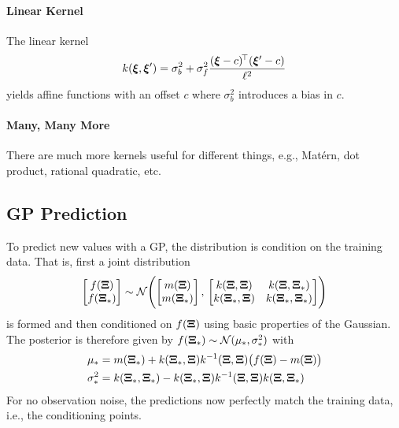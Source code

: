 			\paragraph{Linear Kernel}
				The linear kernel
				\begin{equation}
					k(\bm{\xi}, \bm{\xi}') = \sigma_b^2 + \sigma_f^2 \frac{(\bm{\xi} - c)^{\!\top} (\bm{\xi}' - c)}{\ell^2}
				\end{equation}
				yields affine functions with an offset \(c\) where \( \sigma_b^2 \) introduces a bias in \(c\).

			\paragraph{Many, Many More}
				There are much more kernels useful for different things, e.g., Matérn, dot product, rational quadratic, etc.

		\subsection{GP Prediction}
			To predict new values with a GP, the distribution is condition on the training data. That is, first a joint distribution
			\begin{equation}
				\begin{bmatrix}
					f(\bm{\mathrm{\Xi}}) \\
					f(\bm{\mathrm{\Xi}}_\ast)
				\end{bmatrix}
				\sim
				\mathcal{N}\Biggl(
					\begin{bmatrix}
						m(\bm{\mathrm{\Xi}}) \\
						m(\bm{\mathrm{\Xi}}_\ast)
					\end{bmatrix},\,
					\begin{bmatrix}
						k(\bm{\mathrm{\Xi}}, \bm{\mathrm{\Xi}}) & k(\bm{\mathrm{\Xi}}, \bm{\mathrm{\Xi}}_\ast) \\
						k(\bm{\mathrm{\Xi}}_\ast, \bm{\mathrm{\Xi}}) & k(\bm{\mathrm{\Xi}}_\ast, \bm{\mathrm{\Xi}}_\ast)
					\end{bmatrix}
				\Biggr)
			\end{equation}
			is formed and then conditioned on \( f(\bm{\mathrm{\Xi}}) \) using basic properties of the Gaussian. The posterior is therefore given by \( f(\bm{\mathrm{\Xi}}_\ast) \sim \mathcal{N}(\mu_\ast, \sigma_\ast^2) \) with
			\begin{align}
				\mu_\ast &= m(\bm{\mathrm{\Xi}}_\ast) + k(\bm{\mathrm{\Xi}}_\ast, \bm{\mathrm{\Xi}}) k^{-1}(\bm{\mathrm{\Xi}}, \bm{\mathrm{\Xi}}) \bigl( f(\bm{\mathrm{\Xi}}) - m(\bm{\mathrm{\Xi}}) \bigr) \\
				\sigma_\ast^2 &= k(\bm{\mathrm{\Xi}}_\ast, \bm{\mathrm{\Xi}}_\ast) - k(\bm{\mathrm{\Xi}}_\ast, \bm{\mathrm{\Xi}}) k^{-1}(\bm{\mathrm{\Xi}}, \bm{\mathrm{\Xi}}) k(\bm{\mathrm{\Xi}}, \bm{\mathrm{\Xi}}_\ast)
			\end{align}
			For no observation noise, the predictions now perfectly match the training data, i.e., the conditioning points.


